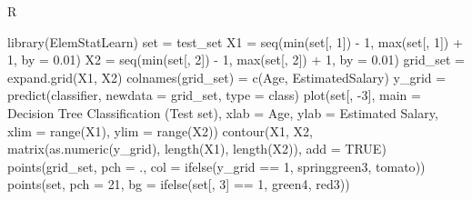 \documentclass[
]{book}
\newenvironment{Shaded}{\begin{snugshade}}{\end{snugshade}}
\newcommand{\AttributeTok}[1]{\textcolor[rgb]{0.77,0.63,0.00}{#1}}
\newcommand{\ConstantTok}[1]{\textcolor[rgb]{0.00,0.00,0.00}{#1}}
\newcommand{\DecValTok}[1]{\textcolor[rgb]{0.00,0.00,0.81}{#1}}
\newcommand{\FloatTok}[1]{\textcolor[rgb]{0.00,0.00,0.81}{#1}}
\newcommand{\FunctionTok}[1]{\textcolor[rgb]{0.00,0.00,0.00}{#1}}
\newcommand{\NormalTok}[1]{#1}
\newcommand{\OtherTok}[1]{\textcolor[rgb]{0.56,0.35,0.01}{#1}}
\newcommand{\SpecialCharTok}[1]{\textcolor[rgb]{0.00,0.00,0.00}{#1}}
\newcommand{\StringTok}[1]{\textcolor[rgb]{0.31,0.60,0.02}{#1}}
\theoremstyle{definition}
\theoremstyle{definition}
\theoremstyle{definition}
\theoremstyle{definition}
\theoremstyle{remark}
\begin{document}
R

\begin{Shaded}
\begin{Highlighting}[]
\FunctionTok{library}\NormalTok{(ElemStatLearn)}
\NormalTok{set }\OtherTok{=}\NormalTok{ test\_set}
\NormalTok{X1 }\OtherTok{=} \FunctionTok{seq}\NormalTok{(}\FunctionTok{min}\NormalTok{(set[, }\DecValTok{1}\NormalTok{]) }\SpecialCharTok{{-}} \DecValTok{1}\NormalTok{, }\FunctionTok{max}\NormalTok{(set[, }\DecValTok{1}\NormalTok{]) }\SpecialCharTok{+} \DecValTok{1}\NormalTok{, }\AttributeTok{by =} \FloatTok{0.01}\NormalTok{)}
\NormalTok{X2 }\OtherTok{=} \FunctionTok{seq}\NormalTok{(}\FunctionTok{min}\NormalTok{(set[, }\DecValTok{2}\NormalTok{]) }\SpecialCharTok{{-}} \DecValTok{1}\NormalTok{, }\FunctionTok{max}\NormalTok{(set[, }\DecValTok{2}\NormalTok{]) }\SpecialCharTok{+} \DecValTok{1}\NormalTok{, }\AttributeTok{by =} \FloatTok{0.01}\NormalTok{)}
\NormalTok{grid\_set }\OtherTok{=} \FunctionTok{expand.grid}\NormalTok{(X1, X2)}
\FunctionTok{colnames}\NormalTok{(grid\_set) }\OtherTok{=} \FunctionTok{c}\NormalTok{(}\StringTok{\textquotesingle{}Age\textquotesingle{}}\NormalTok{, }\StringTok{\textquotesingle{}EstimatedSalary\textquotesingle{}}\NormalTok{)}
\NormalTok{y\_grid }\OtherTok{=} \FunctionTok{predict}\NormalTok{(classifier, }\AttributeTok{newdata =}\NormalTok{ grid\_set, }\AttributeTok{type =} \StringTok{\textquotesingle{}class\textquotesingle{}}\NormalTok{)}
\FunctionTok{plot}\NormalTok{(set[, }\SpecialCharTok{{-}}\DecValTok{3}\NormalTok{], }\AttributeTok{main =} \StringTok{\textquotesingle{}Decision Tree Classification (Test set)\textquotesingle{}}\NormalTok{,}
     \AttributeTok{xlab =} \StringTok{\textquotesingle{}Age\textquotesingle{}}\NormalTok{, }\AttributeTok{ylab =} \StringTok{\textquotesingle{}Estimated Salary\textquotesingle{}}\NormalTok{,}
     \AttributeTok{xlim =} \FunctionTok{range}\NormalTok{(X1), }\AttributeTok{ylim =} \FunctionTok{range}\NormalTok{(X2))}
\FunctionTok{contour}\NormalTok{(X1, X2, }\FunctionTok{matrix}\NormalTok{(}\FunctionTok{as.numeric}\NormalTok{(y\_grid), }\FunctionTok{length}\NormalTok{(X1), }\FunctionTok{length}\NormalTok{(X2)), }\AttributeTok{add =} \ConstantTok{TRUE}\NormalTok{)}
\FunctionTok{points}\NormalTok{(grid\_set, }\AttributeTok{pch =} \StringTok{\textquotesingle{}.\textquotesingle{}}\NormalTok{, }\AttributeTok{col =} \FunctionTok{ifelse}\NormalTok{(y\_grid }\SpecialCharTok{==} \DecValTok{1}\NormalTok{, }\StringTok{\textquotesingle{}springgreen3\textquotesingle{}}\NormalTok{, }\StringTok{\textquotesingle{}tomato\textquotesingle{}}\NormalTok{))}
\FunctionTok{points}\NormalTok{(set, }\AttributeTok{pch =} \DecValTok{21}\NormalTok{, }\AttributeTok{bg =} \FunctionTok{ifelse}\NormalTok{(set[, }\DecValTok{3}\NormalTok{] }\SpecialCharTok{==} \DecValTok{1}\NormalTok{, }\StringTok{\textquotesingle{}green4\textquotesingle{}}\NormalTok{, }\StringTok{\textquotesingle{}red3\textquotesingle{}}\NormalTok{))}
\end{Highlighting}
\end{Shaded}
\end{document}
